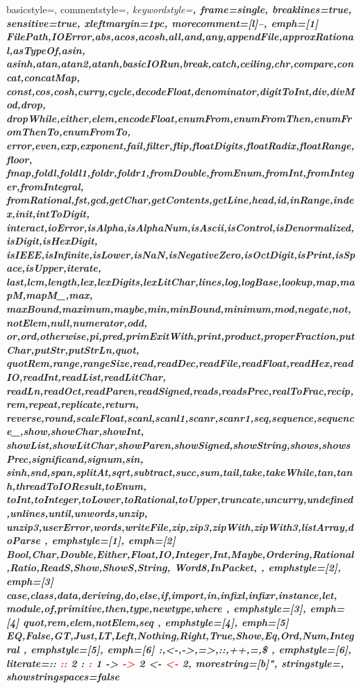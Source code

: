  {%
  basicstyle=\footnotesize\ttfamily,%
  commentstyle=\slshape\color[gray][1.0],%
  keywordstyle=\bfseries,%
  frame=single,
  breaklines=true,
  sensitive=true,
  xleftmargin=1pc,
  morecomment=[l]{--},
  emph={[1]
    FilePath,IOError,abs,acos,acosh,all,and,any,appendFile,approxRational,asTypeOf,asin,
    asinh,atan,atan2,atanh,basicIORun,break,catch,ceiling,chr,compare,concat,concatMap,
    const,cos,cosh,curry,cycle,decodeFloat,denominator,digitToInt,div,divMod,drop,
    dropWhile,either,elem,encodeFloat,enumFrom,enumFromThen,enumFromThenTo,enumFromTo,
    error,even,exp,exponent,fail,filter,flip,floatDigits,floatRadix,floatRange,floor,
    fmap,foldl,foldl1,foldr,foldr1,fromDouble,fromEnum,fromInt,fromInteger,fromIntegral,
    fromRational,fst,gcd,getChar,getContents,getLine,head,id,inRange,index,init,intToDigit,
    interact,ioError,isAlpha,isAlphaNum,isAscii,isControl,isDenormalized,isDigit,isHexDigit,
    isIEEE,isInfinite,isLower,isNaN,isNegativeZero,isOctDigit,isPrint,isSpace,isUpper,iterate,
    last,lcm,length,lex,lexDigits,lexLitChar,lines,log,logBase,lookup,map,mapM,mapM_,max,
    maxBound,maximum,maybe,min,minBound,minimum,mod,negate,not,notElem,null,numerator,odd,
    or,ord,otherwise,pi,pred,primExitWith,print,product,properFraction,putChar,putStr,putStrLn,quot,
    quotRem,range,rangeSize,read,readDec,readFile,readFloat,readHex,readIO,readInt,readList,readLitChar,
    readLn,readOct,readParen,readSigned,reads,readsPrec,realToFrac,recip,rem,repeat,replicate,return,
    reverse,round,scaleFloat,scanl,scanl1,scanr,scanr1,seq,sequence,sequence_,show,showChar,showInt,
    showList,showLitChar,showParen,showSigned,showString,shows,showsPrec,significand,signum,sin,
    sinh,snd,span,splitAt,sqrt,subtract,succ,sum,tail,take,takeWhile,tan,tanh,threadToIOResult,toEnum,
    toInt,toInteger,toLower,toRational,toUpper,truncate,uncurry,undefined,unlines,until,unwords,unzip,
    unzip3,userError,words,writeFile,zip,zip3,zipWith,zipWith3,listArray,doParse
  },%
  emphstyle={[1]\color{NU0}},%
  emph={[2]
    Bool,Char,Double,Either,Float,IO,Integer,Int,Maybe,Ordering,Rational,Ratio,ReadS,Show,ShowS,String, Word8,InPacket,
  },%
  emphstyle={[2]\bfseries\color{KW4}},%
  emph={[3]
    case,class,data,deriving,do,else,if,import,in,infixl,infixr,instance,let,
    module,of,primitive,then,type,newtype,where
  },
  emphstyle={[3]\color{darkblue}},
  emph={[4]
    quot,rem,elem,notElem,seq
  },
  emphstyle={[4]\color{NU0}\bfseries},
  emph={[5]
    EQ,False,GT,Just,LT,Left,Nothing,Right,True,Show,Eq,Ord,Num,Integral
  },
  emphstyle={[5]\color{KW4}\bfseries},
  emph={[6]
  :,{<-},{->},{=>},::,++,=,\$
  },
  emphstyle={[6]\color{red}},
  literate={::} { {\textcolor{red}{::}} }2%
    {:} { {\textcolor{red}{:}} }1%
    {->} { {\textcolor{red}{->}} }2%
    {<-} { {\textcolor{red}{<-}} }2,%
  morestring=[b]",%
  stringstyle=\color{darkgreen},%
  showstringspaces=false
}
{}
{\smallskip}
\newcommand{\ihs}[1]{\lstset{language=fooHaskell,basicstyle=\color[gray]{0.6}}\lstinline|#1|}


